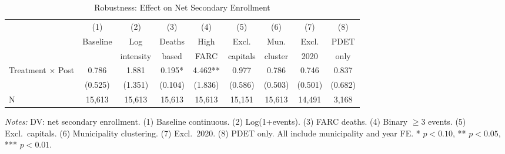 \begin{table}[H]
\centering
\caption{Robustness: Effect on Net Secondary Enrollment}
\label{tab:robustness}
\small
\begin{adjustbox}{max width=\textwidth}
\begin{threeparttable}
\begin{tabular}{lcccccccc}
\toprule
 & (1) & (2) & (3) & (4) & (5) & (6) & (7) & (8) \\
 & Baseline & Log & Deaths & High & Excl. & Mun. & Excl. & PDET \\
 & & intensity & based & FARC & capitals & cluster & 2020 & only \\
\midrule
Treatment $\times$ Post & 0.786 & 1.881 & 0.195* & 4.462** & 0.977 & 0.786 & 0.746 & 0.837 \\
 & (0.525) & (1.351) & (0.104) & (1.836) & (0.586) & (0.503) & (0.501) & (0.682) \\
N & 15,613 & 15,613 & 15,613 & 15,613 & 15,151 & 15,613 & 14,491 &  3,168 \\
\bottomrule
\end{tabular}
\begin{tablenotes}[flushleft]
\footnotesize
\item \textit{Notes:} DV: net secondary enrollment. (1) Baseline continuous. (2) Log(1+events). (3) FARC deaths. (4) Binary $\geq$3 events. (5) Excl.\ capitals. (6) Municipality clustering. (7) Excl.\ 2020. (8) PDET only. All include municipality and year FE. * $p<0.10$, ** $p<0.05$, *** $p<0.01$.
\end{tablenotes}
\end{threeparttable}
\end{adjustbox}
\end{table}
